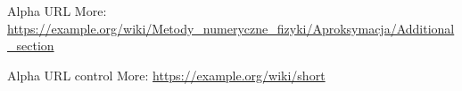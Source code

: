 \documentclass{beamer}
\begin{document}
\begin{frame}{Alpha URL}
More: \url{https://example.org/wiki/Metody_numeryczne_fizyki/Aproksymacja/Additional_section}
\end{frame}
\begin{frame}{Alpha URL control}
More: \url{https://example.org/wiki/short}
\end{frame}
\end{document}
